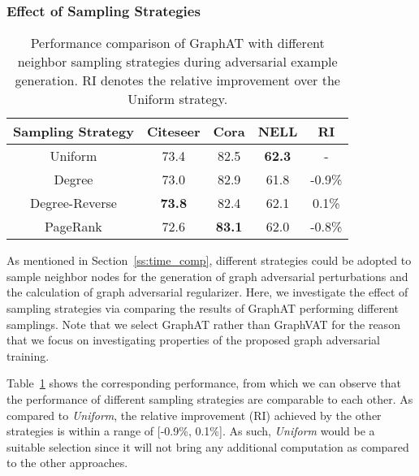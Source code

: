\documentclass[10pt,journal,compsoc]{IEEEtran}
\begin{document}
\subsubsection{Effect of Sampling Strategies}
\begin{table}[]
\centering
\caption{Performance comparison of GraphAT with different neighbor sampling strategies during adversarial example generation. RI denotes the relative improvement over the Uniform strategy.}
\vspace{-0.2cm}
\label{tab:samp_perf}
\begin{tabular}{c|cccc}
\hline
Sampling Strategy & Citeseer & Cora & NELL & RI \\ \hline \hline
Uniform & 73.4 & 82.5 & \textbf{62.3} & - \\ \hline
Degree & 73.0 & 82.9 & 61.8 & -0.9\% \\
Degree-Reverse & \textbf{73.8} & 82.4 & 62.1 & 0.1\% \\
PageRank & 72.6 & \textbf{83.1} & 62.0 & -0.8\% \\ \hline
\end{tabular}\end{table}
As mentioned in Section~\ref{ss:time_comp}, different strategies could be adopted to sample neighbor nodes for the generation of graph adversarial perturbations and the calculation of graph adversarial regularizer. Here, we investigate the effect of sampling strategies via comparing the results of GraphAT performing different samplings. Note that we select GraphAT rather than GraphVAT for the reason that we focus on investigating properties of the proposed graph adversarial training.

Table~\ref{tab:samp_perf} shows the corresponding performance, from which we can observe that the performance of different sampling strategies are comparable to each other. 
{As compared to \textit{Uniform}, the relative improvement (RI) achieved by the other strategies is within a range of [-0.9\%, 0.1\%]. 
As such, \textit{Uniform} would be a suitable selection since it will not bring any additional computation as compared to the other approaches.}
\end{document}
